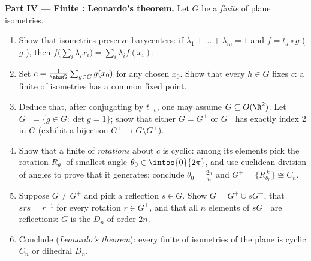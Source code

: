 \begin{problem}
\medskip
\noindent\textbf{Part IV --- Finite : Leonardo's theorem.}
Let $G$ be a \emph{finite}  of plane isometries.
\begin{enumerate}[resume]
  \item Show that isometries preserve barycenters: if
        $\lambda_1 + \dots + \lambda_m = 1$ and $f = t_a \circ
        g$ ($g$ ), then $f\bigl(\sum_i \lambda_i
        x_i\bigr) = \sum_i \lambda_i f(x_i)$.
  \item Set $c = \frac{1}{\abs G}\sum_{g \in G} g(x_0)$ for any
        chosen $x_0$. Show that every $h \in G$ fixes $c$: a
        finite  of isometries has a common fixed point.
  \item Deduce that, after conjugating by $t_{-c}$, one may
        assume $G \subseteq O(\R^2)$. Let $G^{+} = \{g \in G :
        \det g = 1\}$; show that either $G = G^{+}$ or $G^{+}$
        has exactly index $2$ in $G$ (exhibit a bijection $G^+
        \to G \setminus G^+$).
  \item Show that a finite  of \emph{rotations} about $c$
        is cyclic: among its elements pick the rotation
        $R_{\theta_0}$ of smallest angle $\theta_0 \in
        \intoo{0}{2\pi}$, and use euclidean division of angles
        to prove that it generates; conclude $\theta_0 =
        \frac{2\pi}n$ and $G^{+} = \{R_{\theta_0}^{\,k}\} \cong
        C_n$.
  \item Suppose $G \neq G^{+}$ and pick a reflection $s \in G$.
        Show $G = G^{+} \cup sG^{+}$, that $s r s = r^{-1}$ for
        every rotation $r \in G^{+}$, and that all $n$ elements
        of $sG^{+}$ are reflections: $G$ is the \emph{} $D_n$ of order $2n$.
  \item Conclude (\emph{Leonardo's theorem}): every finite 
        of isometries of the plane is cyclic $C_n$ or dihedral
        $D_n$.
\end{enumerate}


\end{problem}
